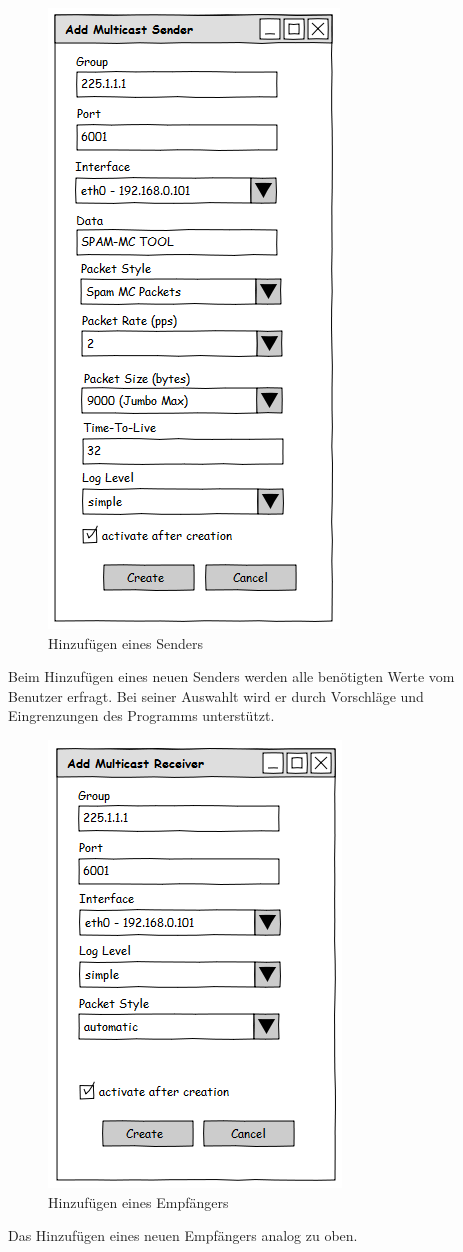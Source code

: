 \begin{figure}[H]
\centering
\includegraphics[scale=0.5]{images/gui/addsender.png}
\caption{Hinzufügen eines Senders}
\end{figure}
Beim Hinzufügen eines neuen Senders werden alle benötigten Werte vom Benutzer
erfragt. Bei seiner Auswahlt wird er durch Vorschläge und Eingrenzungen des
Programms unterstützt.

\begin{figure}[H]
\centering
\includegraphics[scale=0.5]{images/gui/addrec.png}
\caption{Hinzufügen eines Empfängers}
\end{figure}
Das Hinzufügen eines neuen Empfängers analog zu oben.

